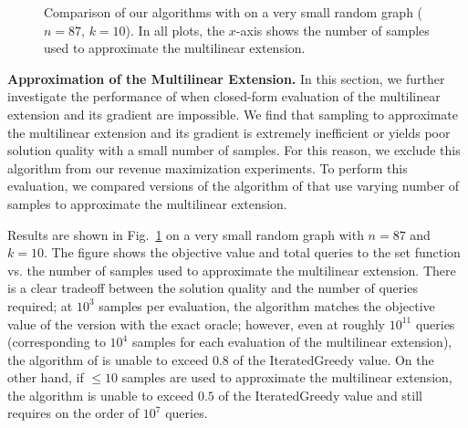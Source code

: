 \begin{figure}[t] \centering
  \caption{Comparison of our algorithms with  on a very small random graph ($n = 87$, $k = 10$). In all plots, the $x$-axis shows the number of samples used to approximate the multilinear extension. } \label{fig:multilinear}
\end{figure} 
\textbf{Approximation of the Multilinear Extension.}
In this section, we further investigate the performance of
 when closed-form evaluation of the multilinear
extension and its gradient are impossible. We find
that sampling to approximate the multilinear extension
and its gradient is extremely inefficient or yields poor solution
quality with a small number of samples. For this reason, we exclude
this algorithm from our revenue maximization experiments.
To perform this evaluation, we compared versions of the
algorithm of  that use varying number
of samples to approximate the multilinear extension.

Results are shown in Fig.~\ref{fig:multilinear} 
on a very small random graph with $n=87$ and $k = 10$.
The figure shows the objective value
and total queries to the set function vs. the number of samples
used to approximate the multilinear extension. 
There is a clear
tradeoff between the solution quality and the number of queries
required; at $10^3$ samples per evaluation, the algorithm
matches the objective value of the version with the 
exact oracle;
however, even at roughly $10^{11}$ queries (corresponding
to $10^4$ samples for each evaluation of the multilinear extension),
the algorithm of  is unable to exceed $0.8$ of
the IteratedGreedy value. On the other hand, if $\le 10$ samples are used to
approximate the multilinear extension, the algorithm is unable to exceed
$0.5$ of the IteratedGreedy value and still requires on the order of $10^7$
queries. 


